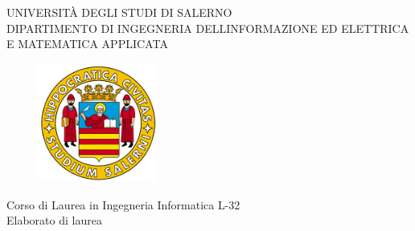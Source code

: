 
\begin{titlepage}
    \begin{center}
        {\fontsize{22}{36}\selectfont\uppercase{Università degli Studi di Salerno}}\\
        \vspace{8mm}
        \uppercase{\large Dipartimento di Ingegneria dell\textquotesingle Informazione ed Elettrica e Matematica applicata}\\
    \end{center}
    \begin{figure}[H]
        \centering
        \includegraphics[width=0.35\textwidth]{img/logo_unisa.png}
    \end{figure}
    \vspace{2mm}
    \begin{center}
        \large{ Corso di Laurea in Ingegneria Informatica L-32}\\
        \vspace{7mm}
        \large{ Elaborato di laurea}\\
        \vspace{15mm}
        {\fontsize{22}{10}}\\
        \vspace{4mm}
        {\fontsize{15}{15}\selectfont{\bf Natural Language Processing and Large Language Models }}
    \end{center}

    \vspace{25mm}
    \noindent
    \begin{minipage}[t]{0.47\textwidth}
        {\fontsize{12}{12}\selectfont{ Relatore:\\\bf Ch.mo Prof. \\Nicola Capuano}}
    \end{minipage}
    \hfill
    \begin{minipage}[t]{0.4\textwidth}\raggedleft
        {\fontsize{12}{12}\selectfont{Candidato: \\ \bf Nunzio Del Gaudio\\ Mat. 0622702277}}
    \end{minipage}

    \vspace{30mm}


\end{titlepage}


